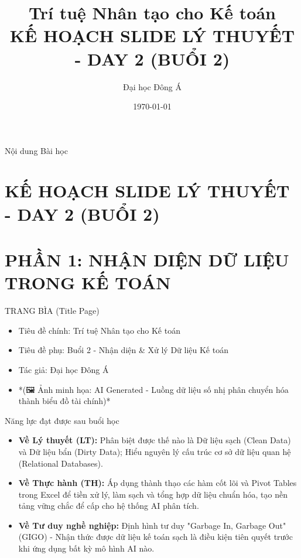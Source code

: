 \documentclass[aspectratio=169]{beamer}
\title[Trí tuệ Nhân tạo cho Kế toán]{Trí tuệ Nhân tạo cho Kế toán \\ \vspace{0.3cm} \Large KẾ HOẠCH SLIDE LÝ THUYẾT - DAY 2 (BUỔI 2)}
\author{Đại học Đông Á}
\date{\today}
\begin{document}
\begin{frame}
    \titlepage
\end{frame}

\begin{frame}{Nội dung Bài học}
    \tableofcontents
\end{frame}


\section{KẾ HOẠCH SLIDE LÝ THUYẾT - DAY 2 (BUỔI 2)}


\section{PHẦN 1: NHẬN DIỆN DỮ LIỆU TRONG KẾ TOÁN}


\begin{frame}{TRANG BÌA (Title Page)}
    \begin{itemize}
        \item Tiêu đề chính: Trí tuệ Nhân tạo cho Kế toán
        \item Tiêu đề phụ: Buổi 2 - Nhận diện \& Xử lý Dữ liệu Kế toán
        \item Tác giả: Đại học Đông Á
        \item *(🖼️ Ảnh minh họa: AI Generated - Luồng dữ liệu số nhị phân chuyển hóa thành biểu đồ tài chính)*
    \end{itemize}
\end{frame}


\begin{frame}{Năng lực đạt được sau buổi học}
    \begin{itemize}
        \item \textbf{Về Lý thuyết (LT):} Phân biệt được thế nào là Dữ liệu sạch (Clean Data) và Dữ liệu bẩn (Dirty Data); Hiểu nguyên lý cấu trúc cơ sở dữ liệu quan hệ (Relational Databases).
        \item \textbf{Về Thực hành (TH):} Áp dụng thành thạo các hàm cốt lõi và Pivot Tables trong Excel để tiền xử lý, làm sạch và tổng hợp dữ liệu chuẩn hóa, tạo nền tảng vững chắc để cấp cho hệ thống AI phân tích.
        \item \textbf{Về Tư duy nghề nghiệp:} Định hình tư duy "Garbage In, Garbage Out" (GIGO) - Nhận thức được dữ liệu kế toán sạch là điều kiện tiên quyết trước khi ứng dụng bất kỳ mô hình AI nào.
    \end{itemize}
\end{frame}
\end{document}
